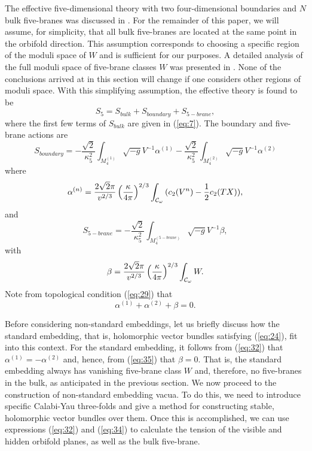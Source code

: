 \documentclass[a4paper,12pt]{article}
\numberwithin{equation}{section}
\theoremstyle{plain}
\begin{document}
The effective five-dimensional theory with two four-dimensional boundaries and
$N$ bulk five-branes was discussed in \cite{NSE}. 
For the remainder of this paper, we
will assume, for simplicity, that all bulk five-branes are located at the same
point in the orbifold direction. This assumption corresponds 
to choosing a specific region of
the moduli space of $W$ and is sufficient for our purposes. 
A detailed analysis of the full moduli space of five-brane classes $W$ was 
presented in \cite{FB}. None of the conclusions arrived 
at in this section will change
if one considers other regions of moduli space. With this simplifying
assumption, the effective theory is found to be
%
\begin{equation}
S_{5}=S_{bulk}+S_{boundary}+S_{5-brane},
\label{eq:30}
\end{equation}
%
where the first few terms of $S_{bulk}$ are given in (\ref{eq:7}). The
boundary and five-brane actions are 
%
\begin{equation}
S_{boundary}=-\frac{\sqrt{2}}{\kappa_{5}^{2}}\int_{M_{4}^{(1)}}
{\sqrt{-g}V^{-1}\alpha^{(1)}} - \frac{\sqrt{2}}{\kappa_{5}^{2}}\int_{M_{4}^{(2)}}
{\sqrt{-g}V^{-1}\alpha^{(2)}} 
\label{eq:31}
\end{equation}
%
where
%
\begin{equation}
\alpha^{(n)}=\frac{2\sqrt{2}\pi}{v^{2/3}}\left(\frac{\kappa}{4\pi}\right)^{2/3}
\int_{{\cal{C}}_{\omega}}{(c_{2}(V^{n})-\frac{1}{2}c_{2}(TX))},
\label{eq:32}
\end{equation}
%
and
%
\begin{equation}
S_{5-brane}=-\frac{\sqrt{2}}{\kappa_{5}^{2}}\int_{M_{4}^{(5-brane)}}
{\sqrt{-g}V^{-1}\beta},
\label{eq:33}
\end{equation}
%
with
%
\begin{equation}
\beta=\frac{2\sqrt{2}\pi}{v^{2/3}}\left(\frac{\kappa}{4\pi}\right)^{2/3}
\int_{{\cal{C}}_{\omega}}{W}.
\label{eq:34}
\end{equation}
%
Note from topological condition (\ref{eq:29}) that
%
\begin{equation}
\alpha^{(1)}+\alpha^{(2)}+\beta=0.
\label{eq:35}
\end{equation}
%


Before considering non-standard embeddings, let us briefly discuss how the
standard embedding, that is, holomorphic vector bundles satisfying 
(\ref{eq:24}), fit into this context. For the standard embedding, it follows
from (\ref{eq:32}) that $\alpha^{(1)}=-\alpha^{(2)}$ and, hence, from
(\ref{eq:35}) that $\beta=0$. That is, the standard embedding always has
vanishing five-brane class $W$ and, therefore, no five-branes in the bulk, as
anticipated in the previous section. We now proceed to the construction of
non-standard embedding vacua. To do this, we need to introduce specific
Calabi-Yau three-folds and give a method for constructing stable,
holomorphic vector bundles over them. Once this is accomplished, we can use
expressions (\ref{eq:32}) and (\ref{eq:34}) to calculate the tension of the visible
and hidden orbifold planes, as well as the bulk five-brane.
\end{document}
